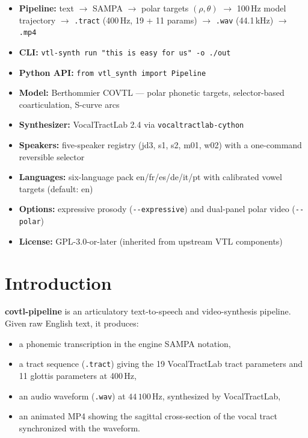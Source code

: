 \documentclass[11pt,a4paper]{article}
\begin{document}
\vfill
\begin{callout}[At a glance]
\begin{itemize}[leftmargin=1.5em,itemsep=2pt]
\item \textbf{Pipeline:} text \(\to\) SAMPA \(\to\) polar targets
      \((\rho,\theta)\) \(\to\) 100\,Hz model trajectory \(\to\)
      \texttt{.tract} (400\,Hz, 19 + 11 params) \(\to\) \texttt{.wav}
      (44.1\,kHz) \(\to\) \texttt{.mp4}
\item \textbf{CLI:} \texttt{vtl-synth run "this is easy for us" -o ./out}
\item \textbf{Python API:} \texttt{from vtl\_synth import Pipeline}
\item \textbf{Model:} Berthommier COVTL --- polar phonetic targets,
      selector-based coarticulation, S-curve arcs
\item \textbf{Synthesizer:} VocalTractLab 2.4 via
      \texttt{vocaltractlab-cython}
\item \textbf{Speakers:} five-speaker registry (jd3, s1, s2, m01,
      w02) with a one-command reversible selector
\item \textbf{Languages:} six-language pack en/fr/es/de/it/pt with
      calibrated vowel targets (default: en)
\item \textbf{Options:} expressive prosody (\texttt{-{}-expressive})
      and dual-panel polar video (\texttt{-{}-polar})
\item \textbf{License:} GPL-3.0-or-later (inherited from upstream VTL
      components)
\end{itemize}
\end{callout}

\newpage
\tableofcontents
\newpage

\section{Introduction}\label{sec:intro}

\textbf{covtl-pipeline} is an articulatory text-to-speech and
video-synthesis pipeline. Given raw English text, it produces:

\begin{itemize}[leftmargin=1.5em]
\item a phonemic transcription in the engine SAMPA notation,
\item a tract sequence (\texttt{.tract}) giving the 19 VocalTractLab tract
      parameters and 11 glottis parameters at 400\,Hz,
\item an audio waveform (\texttt{.wav}) at \(44\,100\,\mathrm{Hz}\),
      synthesized by VocalTractLab,
\item an animated MP4 showing the sagittal cross-section of the vocal
      tract synchronized with the waveform.
\end{itemize}
\end{document}
